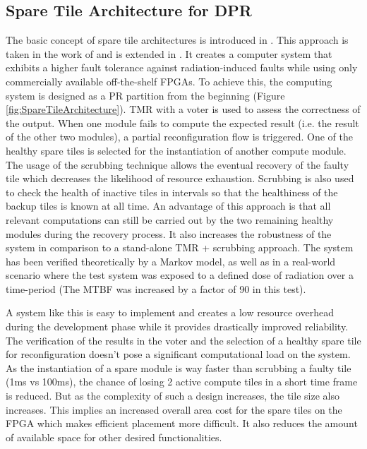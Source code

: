 \subsection{Spare Tile Architecture for \gls{DPR}}\label{sec:SpareTileArchitecture}
The basic concept of spare tile architectures is introduced in \cite{bolchini_tmr_2007}. 
This approach is taken in the work of \cite{lameres_radsat_2015} and is extended in \cite{wilson_hybrid_2017}.
It creates a computer system that exhibits a higher fault tolerance against radiation-induced faults while using only commercially available off-the-shelf \glspl{FPGA}. 
To achieve this, the computing system is designed as a \gls{PR} partition from the beginning (Figure \ref{fig:SpareTileArchitecture}). 
\gls{TMR} with a voter is used to assess the correctness of the output. 
When one module fails to compute the expected result (i.e. the result of the other two modules), a partial reconfiguration flow is triggered.
One of the healthy spare tiles is selected for the instantiation of another compute module.
The usage of the scrubbing technique allows the eventual recovery of the faulty tile which decreases the likelihood of resource exhaustion. 
Scrubbing is also used to check the health of inactive tiles in intervals so that the healthiness of the backup tiles is known at all time. 
An advantage of this approach is that all relevant computations can still be carried out by the two remaining healthy modules during the recovery process. 
It also increases the robustness of the system in comparison to a stand-alone \gls{TMR} + scrubbing approach.
The system has been verified theoretically by a Markov model, as well as in a real-world scenario where the test system was exposed to a defined dose of radiation over a time-period (The \gls{MTBF} was increased by a factor of 90 in this test).

A system like this is easy to implement and creates a low resource overhead during the development phase while it provides drastically improved reliability.
The verification of the results in the voter and the selection of a healthy spare tile for reconfiguration doesn't pose a significant computational load on the system.
As the instantiation of a spare module is way faster than scrubbing a faulty tile (1ms vs 100ms), the chance of losing 2 active compute tiles in a short time frame is reduced. 
But as the complexity of such a design increases, the tile size also increases. 
This implies an increased overall area cost for the spare tiles on the \gls{FPGA} which makes efficient placement more difficult.
It also reduces the amount of available space for other desired functionalities. 

